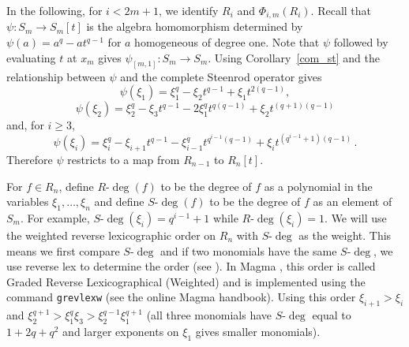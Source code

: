 \documentclass{amsart}
\newcommand{\wdeg}{{S\mbox{-}\deg}}
\newcommand{\rdeg}{{R\mbox{-}\deg}}
\begin{document}
In the following, for $i<2m+1$, we identify $R_i$ and $\Phi_{i,m}(R_i)$. 
Recall that $\psi:S_m\to S_m[t]$ is the algebra homomorphism determined by $\psi(a)=a^q-at^{q-1}$ for $a$ homogeneous of degree one. 
Note that $\psi$ followed by evaluating $t$ at $x_m$ gives $\psi_{[m,1]}:S_m\to S_m$.
Using Corollary~\ref{com_st} and the relationship between $\psi$ and the complete Steenrod operator gives 
\begin{equation}\label{psi_equation:1}
    \psi(\xi_1)=\xi_1^q-\xi_2 t^{q-1}+\xi_1 t^{2(q-1)},
\end{equation}
\begin{equation}\label{psi_equation:2}
\psi(\xi_2)=\xi_2^q-\xi_3 t^{q-1}-2\xi_1^qt^{q(q-1)}+\xi_2 t^{(q+1)(q-1)}
\end{equation}
and, for $i\geq 3$,
\begin{equation}\label{psi_equation:3}
\psi(\xi_{i})=\xi_{i}^q-\xi_{i+1} t^{q-1}-\xi_{i-1}^qt^{q^{i-1}(q-1)}+\xi_{i} t^{(q^{i-1}+1)(q-1)}\, .
\end{equation}
Therefore $\psi$ restricts to a map from $R_{n-1}$ to $R_{n}[t]$.

For $f\in R_{n}$, define $\rdeg(f)$ to be the degree of $f$ as a polynomial in 
the variables $\xi_1,\ldots,\xi_{n}$ 
and define $\wdeg(f)$ to be the degree of $f$ as an element of $S_m$.
For example, $\wdeg(\xi_{i})=q^{i-1}+1$ while $\rdeg(\xi_{i})=1$.
We will use the weighted reverse lexicographic order on $R_{n}$ with $\wdeg$
as the weight. This means we first compare $\wdeg$ and if two monomials
have the same $\wdeg$, we use reverse lex to determine the order
(see \cite[Example 1.2.8]{greuel+pfister:2008}).
In Magma \cite{magma:97}, this order is called Graded Reverse Lexicographical (Weighted)
and is implemented using the command {\tt grevlexw}
(see the online Magma handbook).  
Using this order $\xi_{i+1}>\xi_i$ and
$\xi_2^{q+1}>\xi_1^q\xi_3>\xi_2^{q-1}\xi_1^{q+1}$
(all three monomials have $\wdeg$ equal to $1+2q+q^2$ and
larger exponents on $\xi_1$ gives smaller monomials). 
\end{document}
